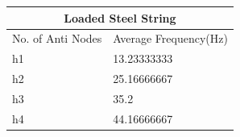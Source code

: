 \begin{center}
\begin{tabular}{|l|l|}
\hline
\multicolumn{2}{|c|}{\textbf{Loaded Steel String}} \\ \hline
No. of Anti   Nodes     & Average Frequency(Hz)    \\ \hline
h1                      & 13.23333333              \\ \hline
h2                      & 25.16666667              \\ \hline
h3                      & 35.2                     \\ \hline
h4                      & 44.16666667              \\ \hline
\end{tabular}
\end{center}



